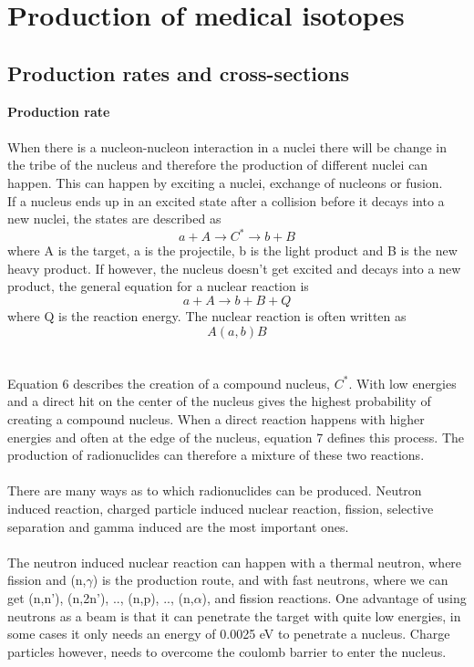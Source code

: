 \documentclass[twoside,english]{uiofysmaster/uiofysmaster}
\begin{document}
\section{Production of medical isotopes}
\subsection{Production rates and cross-sections}
\noindent
\textbf{Production rate}\\
\\
When there is a nucleon-nucleon interaction in a nuclei there will be change in the tribe of the nucleus and therefore the production of different nuclei can happen. This can happen by exciting a nuclei, exchange of nucleons or fusion. \cite{nuclearchem}\\
If a nucleus ends up in an excited state after a collision before it decays into a new nuclei, the states are described as \begin{equation}
    a + A \rightarrow C^* \rightarrow b + B 
\end{equation} \cite{nuclearchem}
where A is the target, a is the projectile, b is the light product and B is the new heavy product. If however, the nucleus doesn't get excited and decays into a new product, the general equation for a nuclear reaction is
\begin{equation}
    a + A \rightarrow b + B + Q 
\end{equation}
where Q is the reaction energy. The nuclear reaction is often written as $$A(a,b)B$$\\
\\
Equation 6 describes the creation of a compound nucleus, $C^*$. With low energies and a direct hit on the center of the nucleus gives the highest probability of creating a compound nucleus. When a direct reaction happens with higher energies and often at the edge of the nucleus, equation 7 defines this process\cite{Nuclear_medicine}. The production of radionuclides can therefore a mixture of these two reactions.
\\
\\
There are many ways as to which radionuclides can be produced. Neutron induced reaction, charged particle induced nuclear reaction, fission, selective separation and gamma induced are the most important ones\cite{Nuclear_medicine}.\\
\\
The neutron induced nuclear reaction can happen with a thermal neutron, where fission and (n,$\gamma$) is the production route, and with fast neutrons, where we can get (n,n'), (n,2n'), .., (n,p), .., (n,$\alpha$), and fission reactions. One advantage of using neutrons as a beam is that it can penetrate the target with quite low energies, in some cases it only needs an energy of 0.0025 eV to penetrate a nucleus\cite{Nuclear_medicine}. Charge particles however, needs to overcome the coulomb barrier to enter the nucleus. 
\end{document}

